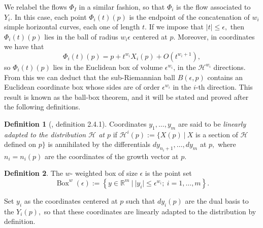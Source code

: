 \documentclass[12pt, letterpaper, reqno]{amsart}
\theoremstyle{definition}
\newtheorem{df}{Definition}
\theoremstyle{plain}
\theoremstyle{remark}
\begin{document}
We relabel the flows $ \Phi_I $ in a similar fashion, so that $ \Phi_i $ is the flow associated to $ Y_i. $ In this case, each point $ \Phi_i(t)(p) $ is the endpoint of the concatenation of $ w_i $ simple horizontal curves, each one of length $ t $. If we impose that $ \left| t \right|\leq \epsilon, $ then $ \Phi_i(t)(p) $ lies in the ball of radius $ w_i\epsilon $ centered at $ p. $ Moreover, in coordinates we have that 
$$ \Phi_i(t)(p)=p+t^{w_i}X_i(p)+ O(t^{w_i+1}), $$ 
so $ \Phi_i(t)(p) $ lies in the Euclidean box of volume $ \epsilon^{w_i} $, in the $ \mathcal{H}^{w_i} $ directions. From this we can deduct that the sub-Riemannian ball $ B(\epsilon,p) $ contains an Euclidean coordinate box whose sides are of order $ \epsilon^{w_i} $ in the $ i $-th direction. This result is known as the ball-box theorem, and it will be stated and proved after the following definitions.

\begin{df}[\cite{montgomery2002tour}, definition 2.4.1] 
	Coordinates $ y_1,\dots,y_m $ are said to be \textit{linearly adapted to the distribution $\mathcal{H}$ at $ p $ } if $ \mathcal{H}^i(p):= \{ X(p) \ | \ X$ is a section of $\mathcal{H}$ defined on $p$$\}$ is annihilated by the differentials $ dy_{n_i+1},\dots, dy_m $ at $ p, $ where $ n_i=n_i(p) $ are the coordinates of the growth vector at $ p. $  
\end{df}
\begin{df}
	The $ w $- weighted box of size $ \epsilon $ is the point set
	$$ \operatorname{Box}^w(\epsilon) := \left\{ y\in \mathbb{R}^m \ | \ |y_i|\leq \epsilon^{w_i}; \ i=1,\dots,m \right\}.  $$ 
\end{df}

Set $ y_i $ as the coordinates centered at $ p $ such that $ dy_i(p) $ are the dual basis to the $ Y_i(p), $ so that these coordinates are linearly adapted to the distribution by definition.
\end{document}
